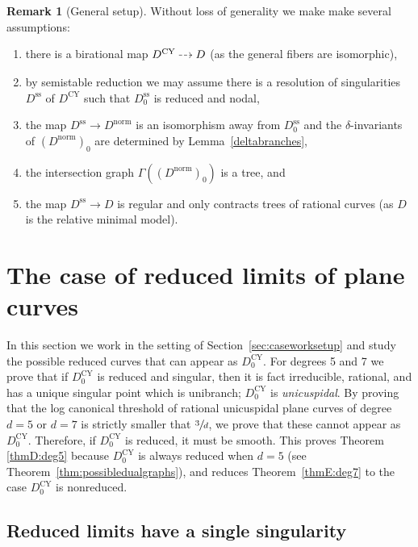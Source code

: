 \documentclass[JEP,XML,SOM,Unicode,NoFloatCountersInSection,published]{cedram}
\newcommand{\dradpl}{{\hspace*{-2mm}\begin{tikzcd}[ampersand replacement=\&,column sep = scriptsize]\mbox{}\ar[r,dashed]\&\mbox{}\end{tikzcd}\hspace*{-2mm}}}
\newcommand{\dratst}{{\hspace*{-2mm}\begin{tikzcd}[ampersand replacement=\&,column sep = small]\mbox{}\ar[r,dashed]\&\mbox{}\end{tikzcd}\hspace*{-2mm}}}
\let\drascst\dratst
\newcommand{\dra}{\mathchoice{\dradpl}{\dratst}{\drascst}{\drascst}}
\theoremstyle{plain}
\theoremstyle{definition}
\newtheorem{remark}[theorem]{Remark}
\newcommand\Dcy{{D^{\mathrm{CY}}}}
\newcommand\Dss{{D^{\mathrm{ss}}}}
\newcommand\Dsso{{D^{\mathrm{ss}}_0}}
\newcommand\Dcyo{{D^{\mathrm{CY}}_0}}
\newcommand\Dnorm{{D^{\mathrm{norm}}}}
\newcommand\Dnormo{{(\Dnorm)_0}}
\begin{document}
\begin{remark}[General setup]\label{rem:semistablereduction}
Without loss of generality we make make several assumptions:
\begin{enumerate}
\item\label{rem:semistablereduction1} there is a birational map $\Dcy\dra D$ (as the general fibers are isomorphic),
\item\label{rem:semistablereduction2} by semistable reduction we may assume there is a resolution of singularities $\Dss$ of $\Dcy$ such that $\Dsso$ is reduced and nodal,
\item\label{rem:semistablereduction3} the map $\Dss\to \Dnorm$ is an isomorphism away from $\Dsso$ and the $\delta$-invariants of $\Dnormo$ are determined by Lemma~\ref{deltabranches},
\item\label{rem:semistablereduction4} the intersection graph $\Gamma(\Dnormo)$ is a tree, and
\item\label{rem:semistablereduction5} the map $\Dss\to D$ is regular and only contracts trees of rational curves (as $D$ is the relative minimal model).
\end{enumerate}
\end{remark}

\section{The case of reduced limits of plane curves}\label{sec:reducedlimits}

In this section we work in the setting of Section~\ref{sec:caseworksetup} and study the possible reduced curves that can appear as $\Dcyo$. For degrees 5 and 7 we prove that if $\Dcyo$ is reduced and singular, then it is fact irreducible, rational, and has a unique singular point which is unibranch; \ie $\Dcyo$ is \textit{unicuspidal}. By proving that the log canonical threshold of rational unicuspidal plane curves of degree $d = 5$ or $d =7$ is strictly smaller that $\sfrac{3}{d}$, we prove that these cannot appear as $\Dcyo$. Therefore, if $\Dcyo$ is reduced, it must be smooth. This proves Theorem \ref{thmD:deg5} because $\Dcyo$ is always reduced when $d = 5$ (see Theorem~\ref{thm:possibledualgraphs}), and reduces Theorem~\ref{thmE:deg7} to the case $\Dcyo$ is nonreduced.

\subsection{Reduced limits have a single singularity}
\end{document}
